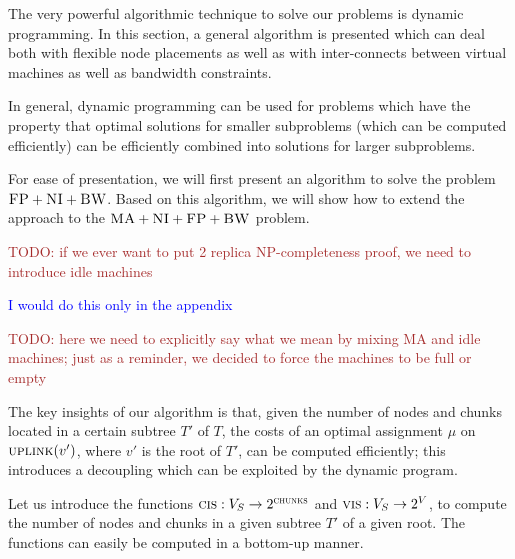 \documentclass[9pt,twocolumn]{scrartcl}
\newcommand{\maciek}[1]{\textcolor{brown}{#1}}
\newcommand{\stefan}[1]{\textcolor{blue}{#1}}
\newcommand{\VmChunkAssignment}{\mu}
\newcommand{\ChunkLocation}{\pi}
\newcommand{\VirtualNodes}{\ensuremath{V}}
\newcommand{\SubstrateNodes}{\ensuremath{V_S}}
\newcommand{\SubstrateNode}{\ensuremath{v}}
\newcommand{\Leaf}{\ensuremath{l}}
\newcommand{\Leaves}{\ensuremath{L}}
\newcommand{\Chunks}{\ensuremath{\textsc{chunks}}}
\newcommand{\Children}{\ensuremath{children}}
\newcommand{\Uplink}{\ensuremath{\textsc{uplink}}}
\newcommand{\ChunkCount}{\ensuremath{\textsc{cis}}}
\newcommand{\VmCount}{\ensuremath{\textsc{vis}}}
\newcommand{\achunk}{\ensuremath{c}}
\newcommand{\CC}{\textsc{NI}}
\newcommand{\FP}{\textsc{FP}}
\newcommand{\BW}{\textsc{BW}}
\newcommand{\MA}{\textsc{MA}}
\newcommand{\Tree}{\ensuremath{T}}
\begin{document}
The very powerful algorithmic technique to solve our problems
is dynamic programming. In this section, a general algorithm
is presented which can deal both with flexible node placements
as well as with inter-connects between virtual machines as well
as bandwidth constraints. 

In general, dynamic programming can be used for problems which have
the property that optimal solutions for smaller subproblems (which can be computed efficiently)
can be efficiently combined into solutions for larger subproblems.

For ease of presentation, we will first present an algorithm to solve
the problem $\FP+\CC+\BW$. Based on this algorithm, we will show how to extend
the approach to the $\MA+\CC+\FP+\BW$ problem.

\maciek{TODO: if we ever want to put 2 replica NP-completeness proof, we need
to introduce idle machines}

\stefan{I would do this only in the appendix}

\maciek{TODO: here we need to explicitly say what we mean by mixing MA and idle
machines; just as a reminder, we decided to force the machines to be full or
empty}


The key insights of our algorithm is that, given the
number of nodes and chunks located in a certain  subtree $\Tree'$ of $\Tree$, the
costs of an optimal assignment $\VmChunkAssignment$ on
$\Uplink(\SubstrateNode')$, where $\SubstrateNode'$ is the root of $\Tree'$,
can be computed efficiently; this introduces a decoupling which can be exploited by the
dynamic program.

Let us introduce the 
functions $\ChunkCount : \SubstrateNodes
\rightarrow
2^\Chunks$ 
and $\VmCount : \SubstrateNodes \rightarrow 2^{\VirtualNodes}$, 
to compute the number of nodes and chunks in a given subtree $\Tree'$
of a given root. The functions can 
easily be computed in a
bottom-up manner.

\end{document}
